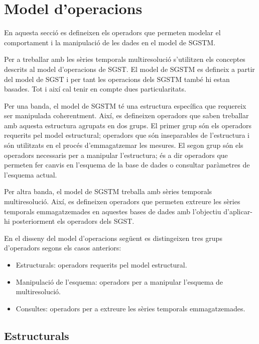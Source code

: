 \section{Model d'operacions}

En aquesta secció es defineixen els operadors que permeten modelar el
comportament i la manipulació de les dades en el model de \gls{SGSTM}.

Per a treballar amb les sèries temporals multiresolució s'utilitzen
els conceptes descrits al model d'operacions de \gls{SGST}. El model
de \gls{SGSTM} es defineix a partir del model de \gls{SGST} i per tant
les operacions dels \gls{SGSTM} també hi estan basades. Tot i així cal
tenir en compte dues particularitats.

Per una banda, el model de \gls{SGSTM} té una estructura específica que
requereix ser manipulada coherentment. Així, es defineixen operadors
que saben treballar amb aquesta estructura agrupats en dos grups.  El
primer grup són els operadors requerits pel model estructural;
operadors que són inseparables de l'estructura i són utilitzats en el
procés d'emmagatzemar les mesures. El segon grup són els operadors
necessaris per a manipular l'estructura; és a dir operadors que
permeten fer canvis en l'esquema de la base de dades o consultar
paràmetres de l'esquema actual.

Per altra banda, el model de \gls{SGSTM} treballa amb sèries temporals
multiresolució. Així, es defineixen operadors que permeten extreure
les sèries temporals emmagatzemades en aquestes bases de dades amb
l'objectiu d'aplicar-hi posteriorment els operadors dels \gls{SGST}.


En el disseny del model d'operacions següent es distingeixen tres
grups d'operadors segons els casos anteriors:

\begin{itemize}
\item Estructurals: operadors requerits pel model estructural.
\item Manipulació de l'esquema: operadors per a manipular l'esquema de
  multiresolució.
\item Consultes: operadors per a extreure les sèries temporals
  emmagatzemades.
\end{itemize}





\subsection{Estructurals}
\label{sec:model:sgstm-estructurals}

